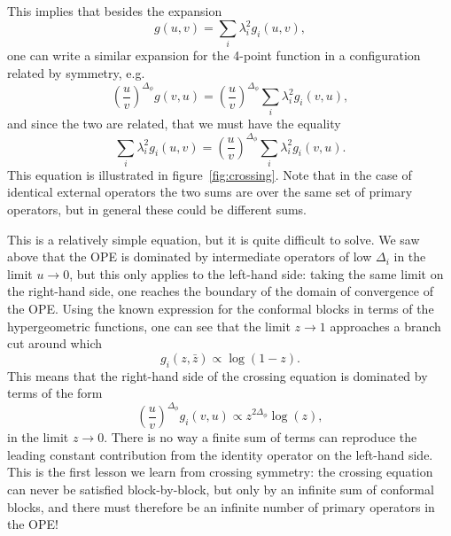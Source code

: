 \documentclass[a4paper,12pt]{article}
\numberwithin{equation}{section}
\begin{document}
This implies that besides the expansion
\begin{equation}
	g(u,v) = \sum_i \lambda_i^2 g_i(u,v),
\end{equation}
one can write a similar expansion for the 4-point function in a configuration related by symmetry, e.g.
\begin{equation}
	\left( \frac{u}{v} \right)^{\Delta_\phi} g(v, u)
	= \left( \frac{u}{v} \right)^{\Delta_\phi} 
	\sum_i \lambda_i^2 g_i(v,u),
\end{equation}
and since the two are related, that we must have the equality
\begin{equation}
	\sum_i \lambda_i^2 g_i(u,v)
	= \left( \frac{u}{v} \right)^{\Delta_\phi} 
	\sum_i \lambda_i^2 g_i(v, u).
\end{equation}
This equation is illustrated in figure~\ref{fig:crossing}. Note that in the case of identical external operators the two sums are over the same set of primary operators, but in general these could be different sums.

This is a relatively simple equation, but it is quite difficult to solve. We saw above that the OPE is dominated by intermediate operators of low $\Delta_i$ in the limit $u \to 0$, but this only applies to the left-hand side: taking the same limit on the right-hand side, one reaches the boundary of the domain of convergence of the OPE.
Using the known expression for the conformal blocks in terms of the hypergeometric functions, one can see that the limit $z \to 1$ approaches a branch cut around which
\begin{equation}
	g_i(z, \bar{z}) \propto \log(1 - z).
\end{equation}
This means that the right-hand side of the crossing equation is dominated by terms of the form
\begin{equation}
	\left( \frac{u}{v} \right)^{\Delta_\phi} 
	g_i(v, u) \propto
	z^{2\Delta_\phi} \log(z),
\end{equation}
in the limit $z \to 0$.
There is no way a finite sum of terms can reproduce the leading constant contribution from the identity operator on the left-hand side.
This is the first lesson we learn from crossing symmetry:
the crossing equation can never be satisfied block-by-block, but only by an infinite sum of conformal blocks, and there must therefore be an infinite number of primary operators in the OPE!
\end{document}
